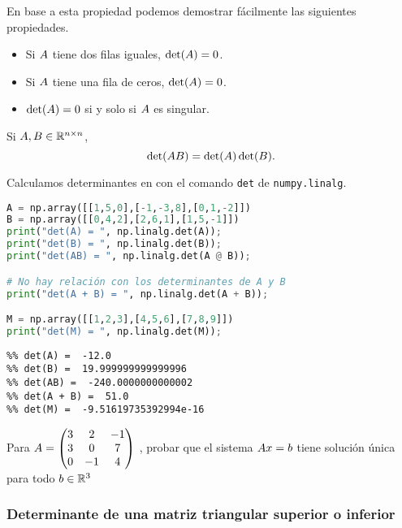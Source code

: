 En base a esta propiedad podemos demostrar f\'acilmente las siguientes propiedades.

\begin{coro}\leavevmode
\begin{itemize}
\item Si $\Ab$ tiene dos filas iguales, $\det(\Ab)= 0$.
\item Si $\Ab$ tiene una fila de ceros, $\det(\Ab)= 0$.
\item $\det(\Ab) = 0$ si y solo si $\Ab$ es singular.
\end{itemize}
\end{coro}

\begin{prop}
Si $\Ab, \Bb \in \R^{n \times n}$,
$$\det(\Ab \Bb) = \det(\Ab)\det(\Bb).$$
\end{prop}

Calculamos determinantes en \python con el comando \texttt{det} de \texttt{numpy.linalg}.
\begin{Shaded}
\begin{lstlisting}[language=python]
A = np.array([[1,5,0],[-1,-3,8],[0,1,-2]])
B = np.array([[0,4,2],[2,6,1],[1,5,-1]])
print("det(A) = ", np.linalg.det(A));
print("det(B) = ", np.linalg.det(B));
print("det(AB) = ", np.linalg.det(A @ B));

# No hay relación con los determinantes de A y B
print("det(A + B) = ", np.linalg.det(A + B));

M = np.array([[1,2,3],[4,5,6],[7,8,9]])
print("det(M) = ", np.linalg.det(M));
\end{lstlisting}
\end{Shaded}

\begin{verbatim}
%% det(A) =  -12.0
%% det(B) =  19.999999999999996
%% det(AB) =  -240.0000000000002
%% det(A + B) =  51.0
%% det(M) =  -9.51619735392994e-16
\end{verbatim}

\begin{ejercicio}
Para $\Ab = \begin{pmatrix} 3 & 2 & -1 \\ 3 & 0 & 7 \\ 0 & -1 & 4 \end{pmatrix}$ , probar que el sistema $\Ab\xb = \bb$ tiene solución única para todo $\bb \in \R^3$
\end{ejercicio}

\subsubsection{Determinante de una matriz triangular superior o inferior}


